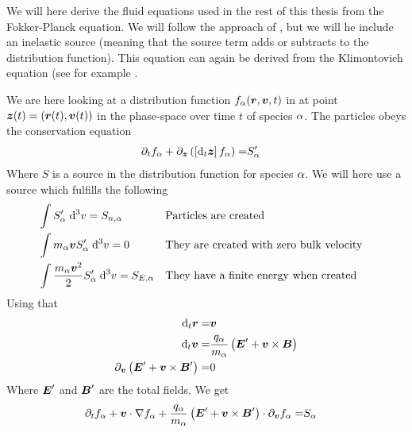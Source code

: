 We will here derive the fluid equations used in the rest of this thesis from the Fokker-Planck equation.
We will follow the approach of \cite{Helander2002book}, but we will he include an inelastic source (meaning that the source term adds or subtracts to the distribution function).
This equation can again be derived from the Klimontovich equation (see for example \cite{Klimontovich1983book}.

We are here looking at a distribution function $f_\alpha(\boldsymbol{r},\boldsymbol{v},t)$ in at point $\boldsymbol{z}(t)=(\boldsymbol{r}(t),\boldsymbol{v}(t))$ in the phase-space over time $t$ of species $\alpha$.
The particles obeys the conservation equation
%
\begin{align*}
    \partial_t f_\alpha + \partial_{\boldsymbol{z}} \left(\left[\text{d}_t \boldsymbol{z}\right]f_\alpha\right) =& S'_\alpha
\end{align*}
%
Where $S$ is a source in the distribution function for species $\alpha$.
We will here use a source which fulfills the following
%
\begin{align*}
    &\int {S'_{\alpha}} \; \text{d} {^3v} = S_{n,\alpha}&
    &\text{Particles are created}&
    \\
    &\int {m_\alpha\boldsymbol{v} S'_\alpha} \; \text{d} {^3v} = 0&
    &\text{They are created with zero bulk velocity}&
    \\
    &\int {\frac{m_\alpha\boldsymbol{v}^2}{2} S'_\alpha} \; \text{d} {^3v} = S_{E,\alpha}&
    &\text{They have a finite energy when created}&
\end{align*}
%
Using that
%
\begin{align*}
    \text{d}_t \boldsymbol{r}     =& \boldsymbol{v}\\
    \text{d}_t \boldsymbol{v}     =& \frac{q_\alpha}{m_\alpha}\left(\boldsymbol{E}'+\boldsymbol{v}\times\boldsymbol{B}\right)\\
    \partial_{\boldsymbol{v}} \left(\boldsymbol{E}'+\boldsymbol{v}\times\boldsymbol{B}'\right) =& 0
\end{align*}
%
Where $\boldsymbol{E}'$ and $\boldsymbol{B}'$ are the total fields.
We get
%
\begin{align*}
      \partial_t f_\alpha
    + \boldsymbol{v}\cdot\nabla f_\alpha
    + \frac{q_\alpha}{m_\alpha}
      \left(\boldsymbol{E}'+\boldsymbol{v}\times\boldsymbol{B}'\right)\cdot\partial_{\boldsymbol{v}}f_\alpha
    =& S_\alpha
\end{align*}

